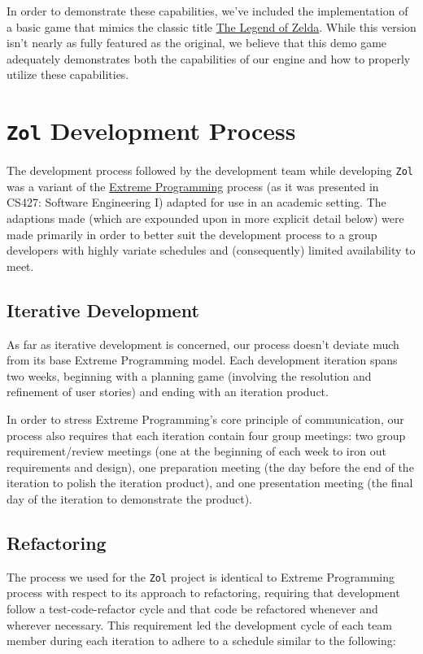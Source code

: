 \documentclass{article}
\newcommand{\projectname}[0] {\texttt{Zol} }
\newcommand{\hrefloz}[0] {\href{http://en.wikipedia.org/wiki/The\_ Legend\_ of\_ Zelda\_ (video\_ game)}{The Legend of Zelda}}
\newcommand{\hrefxp}[0] {\href{http://www.extremeprogramming.org/}{Extreme Programming} }
\begin{document}
	In order to demonstrate these capabilities, we've included the implementation
	of a basic game that mimics the classic title \hrefloz.  While this version
	isn't nearly as fully featured as the original, we believe that this demo game
	adequately demonstrates both the capabilities of our engine and how to properly
	utilize these capabilities.


	\section[Development]{\projectname Development Process}
	The development process followed by the development team while developing
	\projectname was a variant of the \hrefxp process (as it was presented in
	CS427: Software Engineering I) adapted for use in an academic setting.  
	The adaptions made (which are expounded upon in more explicit detail below) 
	were made primarily in order to better suit the development process to a group 
	developers with highly variate schedules and (consequently) limited availability 
	to meet.

		\subsection{Iterative Development}
		As far as iterative development is concerned, our process doesn't deviate
		much from its base Extreme Programming model.  Each development iteration
		spans two weeks, beginning with a planning game (involving the resolution 
		and refinement of user stories) and ending with an iteration product.

		In order to stress Extreme Programming's core principle of communication,
		our process also requires that each iteration contain four group meetings:
		two group requirement/review meetings (one at the beginning of each week
		to iron out requirements and design), one preparation meeting (the day 
		before the end of the iteration to polish the iteration product), and
		one presentation meeting (the final day of the iteration to demonstrate
		the product).

		\subsection{Refactoring}
		The process we used for the \projectname project is identical to Extreme
		Programming process with respect to its approach to refactoring, requiring 
		that development follow a test-code-refactor cycle and that code be 
		refactored whenever and wherever necessary.  This requirement led the
		development cycle of each team member during each iteration to adhere 
		to a schedule similar to the following:
\end{document}
